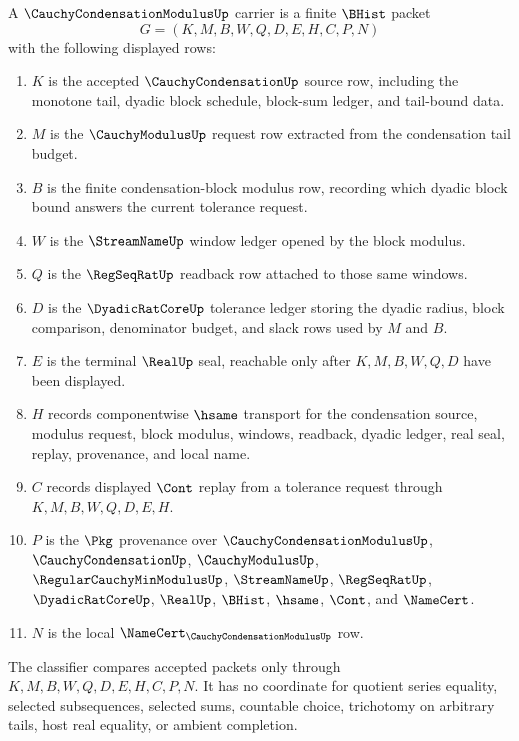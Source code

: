 \begin{definition}
\label{def:cauchy-condensation-modulus-carrier}
A $\CauchyCondensationModulusUp$ carrier is a finite $\BHist$ packet
$$
G=(K,M,B,W,Q,D,E,H,C,P,N)
$$
with the following displayed rows:
\begin{enumerate}
\item $K$ is the accepted $\CauchyCondensationUp$ source row, including the monotone tail, dyadic block schedule, block-sum ledger, and tail-bound data.
\item $M$ is the $\CauchyModulusUp$ request row extracted from the condensation tail budget.
\item $B$ is the finite condensation-block modulus row, recording which dyadic block bound answers the current tolerance request.
\item $W$ is the $\StreamNameUp$ window ledger opened by the block modulus.
\item $Q$ is the $\RegSeqRatUp$ readback row attached to those same windows.
\item $D$ is the $\DyadicRatCoreUp$ tolerance ledger storing the dyadic radius, block comparison, denominator budget, and slack rows used by $M$ and $B$.
\item $E$ is the terminal $\RealUp$ seal, reachable only after $K,M,B,W,Q,D$ have been displayed.
\item $H$ records componentwise $\hsame$ transport for the condensation source, modulus request, block modulus, windows, readback, dyadic ledger, real seal, replay, provenance, and local name.
\item $C$ records displayed $\Cont$ replay from a tolerance request through $K,M,B,W,Q,D,E,H$.
\item $P$ is the $\Pkg$ provenance over $\CauchyCondensationModulusUp$, $\CauchyCondensationUp$, $\CauchyModulusUp$, $\RegularCauchyMinModulusUp$, $\StreamNameUp$, $\RegSeqRatUp$, $\DyadicRatCoreUp$, $\RealUp$, $\BHist$, $\hsame$, $\Cont$, and $\NameCert$.
\item $N$ is the local $\NameCert_{\CauchyCondensationModulusUp}$ row.
\end{enumerate}
The classifier compares accepted packets only through $K,M,B,W,Q,D,E,H,C,P,N$. It has no coordinate for quotient series equality, selected subsequences, selected sums, countable choice, trichotomy on arbitrary tails, host real equality, or ambient completion.
\end{definition}

